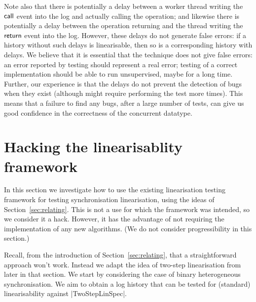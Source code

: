 Note also that there is potentially a delay between a worker thread writing the
$\mathsf{call}$ event into the log and actually calling the operation; and likewise
there is potentially a delay between the operation returning and the thread
writing the $\mathsf{return}$ event into the log.  However, these delays do not
generate false errors: if a history without such delays is linearisable, then
so is a corresponding history with delays.  We believe that it is essential
that the technique does not give false errors: an error reported by testing
should represent a real error; testing of a correct implementation should be
able to run unsupervised, maybe for a long time.  Further, our experience is
that the delays do not prevent the detection of bugs when they exist (although
might require performing the test more times).  This means that a failure to
find any bugs, after a large number of tests, can give us good confidence in
the correctness of the concurrent datatype.


\section{Hacking the linearisablity framework}
\label{sec:testing-hacking}

In this section we investigate how to use the existing linearisation testing
framework for testing synchronisation linearisation, using the ideas of
Section~\ref{sec:relating}.  This is not a use for which the framework
was intended, so we consider it a hack.  However, it has the advantage of not
requiring the implementation of any new algorithms.  (We do not consider
progressibility in this section.)

Recall, from the introduction of Section~\ref{sec:relating}, that a
straightforward approach won't work.  Instead we adapt the idea of two-step
linearisation from later in that section.  We start by considering the case of
binary heterogeneous synchronisation.  We aim to obtain a log history that can
be tested for (standard) linearisability against |TwoStepLinSpec|.

